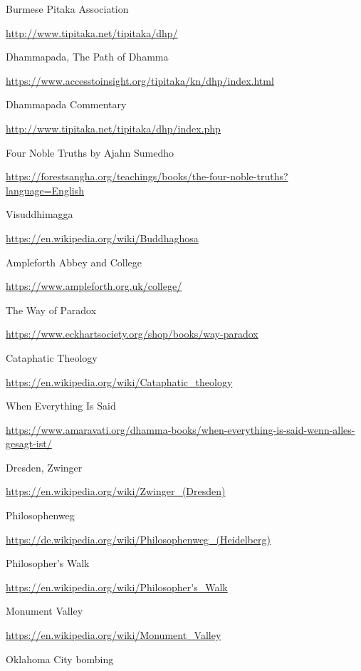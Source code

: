 \begin{thebibliography}{9}
 Burmese Pitaka Association

  {\urlsize \url{http://www.tipitaka.net/tipitaka/dhp/}}

 Dhammapada, The Path of Dhamma

  {\urlsize \url{https://www.accesstoinsight.org/tipitaka/kn/dhp/index.html}}

 Dhammapada Commentary

  {\urlsize \url{http://www.tipitaka.net/tipitaka/dhp/index.php}}

 Four Noble Truths by Ajahn Sumedho

  {\urlsize \url{https://forestsangha.org/teachings/books/the-four-noble-truths?language=English}}

 Visuddhimagga

  {\urlsize \url{https://en.wikipedia.org/wiki/Buddhaghosa}}

 Ampleforth Abbey and College

  {\urlsize \url{https://www.ampleforth.org.uk/college/}}

 The Way of Paradox

  {\urlsize \url{https://www.eckhartsociety.org/shop/books/way-paradox}}

 Cataphatic Theology

  {\urlsize \url{https://en.wikipedia.org/wiki/Cataphatic_theology}}

 When Everything Is Said

  {\urlsize \url{https://www.amaravati.org/dhamma-books/when-everything-is-said-wenn-alles-gesagt-ist/}}

 Dresden, Zwinger

  {\urlsize \url{https://en.wikipedia.org/wiki/Zwinger_(Dresden)}}

 Philosophenweg

  {\urlsize \url{https://de.wikipedia.org/wiki/Philosophenweg_(Heidelberg)}}

 Philosopher's Walk

  {\urlsize \url{https://en.wikipedia.org/wiki/Philosopher's_Walk}}

 Monument Valley

  {\urlsize \url{https://en.wikipedia.org/wiki/Monument_Valley}}

 Oklahoma City bombing


\end{thebibliography}
